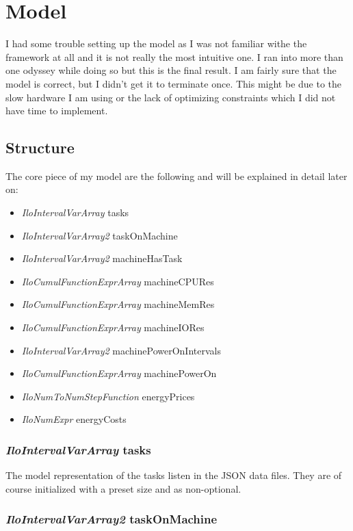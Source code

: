 \section{Model}

I had some trouble setting up the model as I was not familiar withe the framework at all and it is not really the most intuitive one. I ran into more than one odyssey while doing so but this is the final result. I am fairly sure that the model is correct, but I didn't get it to terminate once. This might be due to the slow hardware I am using 
or the lack of optimizing constraints which I did not have time to implement.

\subsection{Structure}

The core piece of my model are the following and will be explained in detail later on:

\begin{itemize}
	\item \textit{IloIntervalVarArray} tasks
	\item \textit{IloIntervalVarArray2} taskOnMachine
	\item \textit{IloIntervalVarArray2} machineHasTask
	\item \textit{IloCumulFunctionExprArray} machineCPURes
	\item \textit{IloCumulFunctionExprArray} machineMemRes
	\item \textit{IloCumulFunctionExprArray} machineIORes
	\item \textit{IloIntervalVarArray2} machinePowerOnIntervals
	\item \textit{IloCumulFunctionExprArray} machinePowerOn
	\item \textit{IloNumToNumStepFunction} energyPrices
	\item \textit{IloNumExpr} energyCosts
\end{itemize}

\subsubsection{\textit{IloIntervalVarArray} tasks}

The model representation of the tasks listen in the JSON data files. They are of course initialized 
with a preset size and as non-optional.

\subsubsection{\textit{IloIntervalVarArray2} taskOnMachine}

